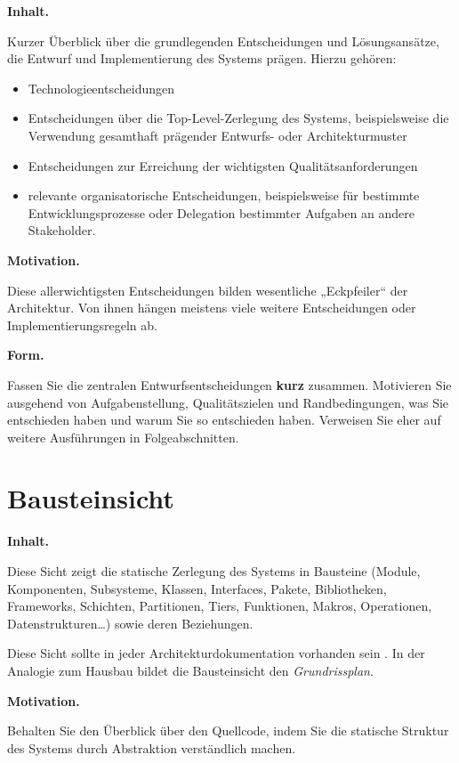 \documentclass[]{article}
\begin{document}
\textbf{Inhalt.}

Kurzer Überblick über die grundlegenden Entscheidungen und
Lösungsansätze, die Entwurf und Implementierung des Systems prägen.
Hierzu gehören:

\begin{itemize}
\item
  Technologieentscheidungen
\item
  Entscheidungen über die Top-Level-Zerlegung des Systems,
  beispielsweise die Verwendung gesamthaft prägender Entwurfs- oder
  Architekturmuster
\item
  Entscheidungen zur Erreichung der wichtigsten Qualitätsanforderungen
\item
  relevante organisatorische Entscheidungen, beispielsweise für
  bestimmte Entwicklungsprozesse oder Delegation bestimmter Aufgaben an
  andere Stakeholder.
\end{itemize}

\textbf{Motivation.}

Diese allerwichtigsten Entscheidungen bilden wesentliche „Eckpfeiler``
der Architektur. Von ihnen hängen meistens viele weitere Entscheidungen
oder Implementierungsregeln ab.

\textbf{Form.}

Fassen Sie die zentralen Entwurfsentscheidungen \textbf{kurz} zusammen.
Motivieren Sie ausgehend von Aufgabenstellung, Qualitätszielen und
Randbedingungen, was Sie entschieden haben und warum Sie so entschieden
haben. Verweisen Sie eher auf weitere Ausführungen in Folgeabschnitten.

\section{Bausteinsicht}\label{section-building-block-view}

\textbf{Inhalt.}

Diese Sicht zeigt die statische Zerlegung des Systems in Bausteine
(Module, Komponenten, Subsysteme, Klassen, Interfaces, Pakete,
Bibliotheken, Frameworks, Schichten, Partitionen, Tiers, Funktionen,
Makros, Operationen, Datenstrukturen\ldots{}) sowie deren Beziehungen.

Diese Sicht sollte in jeder Architekturdokumentation vorhanden sein . In
der Analogie zum Hausbau bildet die Bausteinsicht den
\emph{Grundrissplan}.

\textbf{Motivation.}

Behalten Sie den Überblick über den Quellcode, indem Sie die statische
Struktur des Systems durch Abstraktion verständlich machen.
\end{document}
